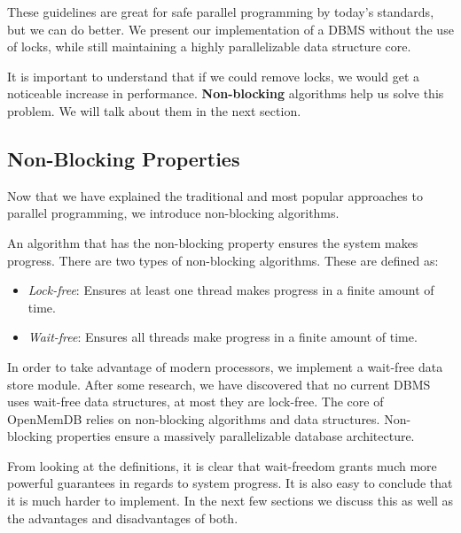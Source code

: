 \documentclass[letterpaper, 12pt]{article}
\begin{document}
These guidelines are great for safe parallel programming by today's standards, but we can do better. We present our implementation of a DBMS without the use of locks, while still maintaining a highly parallelizable data structure core.

\par\vspace{\baselineskip}

It is important to understand that if we could remove locks, we would get a noticeable increase in performance. {\bfseries Non-blocking} algorithms help us solve this problem. We will talk about them in the next section.

\subsection{Non-Blocking Properties}

Now that we have explained the traditional and most popular approaches to parallel programming, we introduce non-blocking algorithms.

\par\vspace{\baselineskip}
An algorithm that has the non-blocking property ensures the system makes progress. There are two types of non-blocking algorithms. These are defined as: 
\begin{itemize}
	\item \textit{Lock-free}: Ensures at least one thread makes progress in a finite amount of time.
	\item \textit{Wait-free}: Ensures all threads make progress in a finite amount of time. 
\end{itemize}
In order to take advantage of modern processors, we implement a wait-free data store module. 
After some research, we have discovered that no current DBMS uses wait-free data 
structures, at most they are lock-free. The core of OpenMemDB relies on non-blocking algorithms and data structures. Non-blocking properties ensure a massively parallelizable database architecture. 

\par\vspace{\baselineskip}

From looking at the definitions, it is clear that wait-freedom grants much more 
powerful guarantees in regards to system progress. It is also easy to conclude that 
it is much harder to implement. In the next few sections we discuss this as well as the 
advantages and disadvantages of both. 
\end{document}
